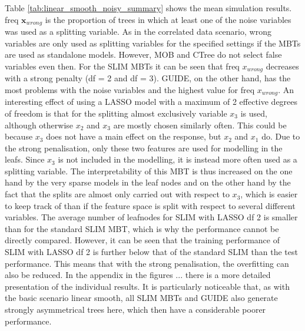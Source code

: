 Table \ref{tab:linear_smooth_noisy_summary} shows the mean simulation results. freq $ \textbf{x}_{wrong}$ is the proportion of trees in which at least one of the noise variables was used as a splitting variable. 
As in the correlated data scenario, wrong variables are only used as splitting variables for the specified settings if the MBTs are used as standalone models. However, MOB and CTree do not select false variables even then. For the SLIM MBTs it can be seen that freq $x_{wrong}$ decreases with a strong penalty (df = 2 and df = 3). GUIDE, on the other hand, has the most problems with the noise variables and the highest value for freq $x_{wrong}$.
An interesting effect of using a LASSO model with a maximum of 2 effective degrees of freedom is that for the splitting almost exclusively variable $x_3$ is used, although otherwise $x_2$ and $x_3$ are mostly chosen similarly often. This could be because $x_3$ does not have a main effect on the response, but $x_2$ and $x_1$ do.  Due to the strong penalisation, only these two features are used for modelling in the leafs. Since $x_3$ is not included in the modelling, it is instead more often used as a splitting variable.
The interpretability of this MBT is thus increased on the one hand by the very sparse models in the leaf nodes and on the other hand by the fact that the splits are almost only carried out with respect to $x_3$, which is easier to keep track of than if the feature space is split with respect to several different variables.
The average number of leafnodes for SLIM with LASSO df 2 is smaller than for the standard SLIM MBT, which is why the performance cannot be directly compared.  However, it can be seen that the training performance of SLIM with LASSO df 2 is further below that of the standard SLIM than the test performance. This means that with the strong penalisation, the overfitting can also be reduced.
In the appendix in the figures ... there is a more detailed presentation of the individual results. It is particularly noticeable that, as with the basic scenario linear smooth, all SLIM MBTs and GUIDE also generate strongly asymmetrical trees here, which then have a considerable poorer performance.




